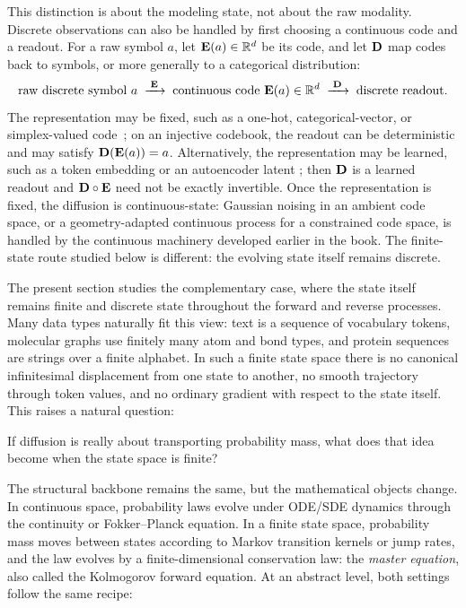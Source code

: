 This distinction is about the modeling state, not about the raw modality.
Discrete observations can also be handled by first choosing a continuous code
and a readout. For a raw symbol $a$, let ${\mathbf{E}}(a)\in\mathbb{R}^d$ be its code,
and let ${\mathbf{D}}$ map codes back to symbols, or more generally to a
categorical distribution:
\[
\text{raw discrete symbol } a
\;\xrightarrow{\;{\mathbf{E}}\;}\;
\text{continuous code } {\mathbf{E}}(a)\in\mathbb{R}^d
\;\xrightarrow{\;{\mathbf{D}}\;}\;
\text{discrete readout}.
\]
The representation may be fixed, such as a one-hot, categorical-vector, or
simplex-valued code~\citep{richemond2022categorical};
on an injective codebook, the readout can be deterministic and may satisfy
${\mathbf{D}}({\mathbf{E}}(a))=a$. Alternatively, the representation may be learned,
such as a token embedding or an autoencoder latent
\citep{li2022diffusionlm,dieleman2022continuous}; then ${\mathbf{D}}$ is a learned
readout and ${\mathbf{D}}\circ{\mathbf{E}}$ need not be exactly invertible. Once the
representation is fixed, the diffusion is continuous-state: Gaussian noising in
an ambient code space, or a geometry-adapted continuous process for a constrained
code space, is handled by the continuous machinery developed earlier in the
book. The finite-state route studied below is different: the evolving state
itself remains discrete.

The present section studies the complementary case, where the state itself
remains finite and discrete state throughout the forward and reverse processes. Many data types naturally fit this view: text is a sequence of
vocabulary tokens, molecular graphs use finitely many atom and bond types, and
protein sequences are strings over a finite alphabet. In such a finite state
space there is no canonical infinitesimal displacement from one state to another,
no smooth trajectory through token values, and no ordinary gradient with respect
to the state itself. This raises a natural question:
\begin{question}
    If diffusion is really about transporting probability mass, what does that idea become when the state space is finite?
\end{question}

The structural backbone remains the same, but the mathematical objects change.
In continuous space, probability laws evolve under ODE/SDE dynamics through the
continuity or Fokker--Planck equation. In a finite state space, probability mass
moves between states according to Markov transition kernels or jump rates, and
the law evolves by a finite-dimensional conservation law: the \emph{master
equation}, also called the Kolmogorov forward equation. At an abstract level,
both settings follow the same recipe:

